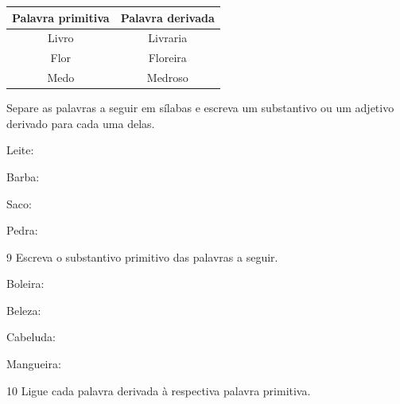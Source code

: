 \begin{center}
\begin{tabular}{c|c}
\hline
\textbf{Palavra primitiva} & \textbf{Palavra derivada} \\ \hline
\rowcolor{blue!20} Livro & Livraria\\
Flor & Floreira\\
\rowcolor{blue!30} Medo & Medroso\\ \hline
\end{tabular}
\end{center}

Separe as palavras a seguir em sílabas e escreva um substantivo ou um
adjetivo derivado para cada uma delas.

\begin{escolha}[itemsep=-5pt]
\item Leite: 
\item
  Barba: 
\item
  Saco: 
\item
  Pedra: 

\end{escolha}

\num{9} Escreva o substantivo primitivo das palavras a seguir.

\begin{escolha}[itemsep=-5pt]
\item Boleira: 

\item Beleza: 

\item Cabeluda: 

\item Mangueira: 

\end{escolha}

\num{10} Ligue cada palavra derivada à respectiva palavra primitiva.

\begin{center}
\begin{multicols}{2}







\end{multicols}
\end{center}


